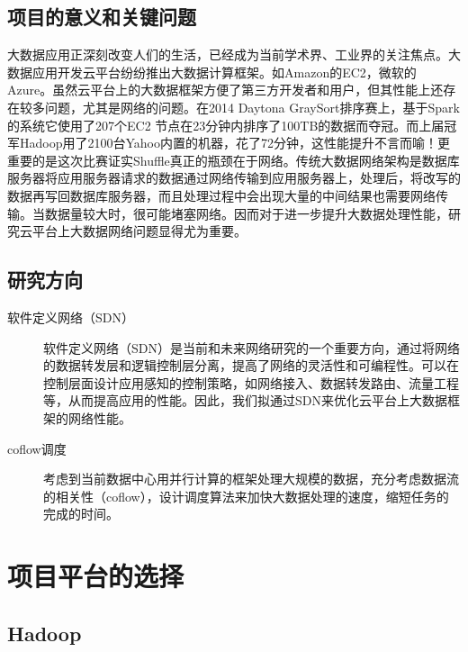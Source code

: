\documentclass[a4paper, 11pt]{article}                                                   %
\begin{document}
\begin{CJK*}{UTF8}{song}
\subsection{项目的意义和关键问题}
大数据应用正深刻改变人们的生活，已经成为当前学术界、工业界的关注焦点。大数据应用开发云平台纷纷推出大数据计算框架。如Amazon的EC2，微软的Azure。虽然云平台上的大数据框架方便了第三方开发者和用户，但其性能上还存在较多问题，尤其是网络的问题。在2014 Daytona GraySort排序赛上，基于Spark的系统它使用了207个EC2 节点在23分钟内排序了100TB的数据而夺冠。而上届冠军Hadoop用了2100台Yahoo内置的机器，花了72分钟，这性能提升不言而喻！更重要的是这次比赛证实Shuffle真正的瓶颈在于网络。传统大数据网络架构是数据库服务器将应用服务器请求的数据通过网络传输到应用服务器上，处理后，将改写的数据再写回数据库服务器，而且处理过程中会出现大量的中间结果也需要网络传输。当数据量较大时，很可能堵塞网络。因而对于进一步提升大数据处理性能，研究云平台上大数据网络问题显得尤为重要。\\
\subsection{研究方向}
\begin{description}
  \item[软件定义网络（SDN）] 软件定义网络（SDN）是当前和未来网络研究的一个重要方向，通过将网络的数据转发层和逻辑控制层分离，提高了网络的灵活性和可编程性。可以在控制层面设计应用感知的控制策略，如网络接入、数据转发路由、流量工程等，从而提高应用的性能。因此，我们拟通过SDN来优化云平台上大数据框架的网络性能。
  \item[coflow调度] 考虑到当前数据中心用并行计算的框架处理大规模的数据，充分考虑数据流的相关性（coflow），设计调度算法来加快大数据处理的速度，缩短任务的完成的时间。
\end{description}
\section{项目平台的选择}
\subsection{Hadoop}

\end{CJK*}
\end{document}
